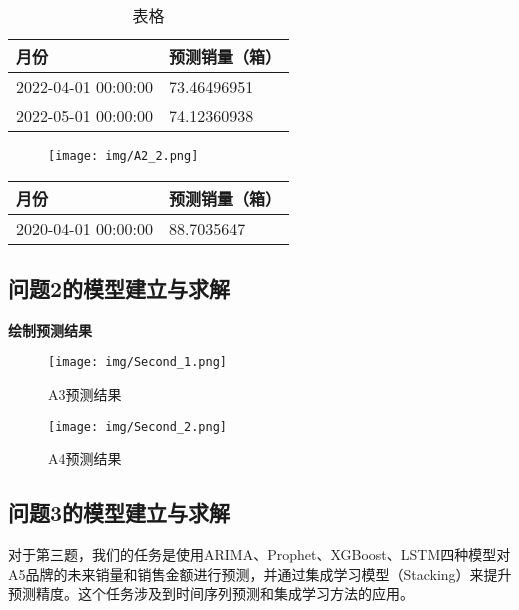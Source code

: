 \documentclass[a4paper]{article}
\begin{document}
	\setlength{\extrarowheight}{4pt}
	\begin{table}[H]

		\centering
	
		\begin{tabularx}{\textwidth}{|X|X|} %
	
		\hline
	
		月份 & 预测销量（箱）\\
	
		\hline
	
		\hline
		2022-04-01 00:00:00	&73.46496951\\
		\hline
		2022-05-01 00:00:00	&74.12360938\\
	
		\hline
	
		\end{tabularx}
	
		\caption{表格}
	
	\end{table}


	\begin{figure}[H]
		\centering
		\texttt{[image: img/A2\_2.png]}
	\end{figure}


	\setlength{\extrarowheight}{4pt}
	\begin{table}[H]
		\centering
		\begin{tabularx}{\textwidth}{|X|X|} %
			\hline
			月份 & 预测销量（箱）\\
			\hline
			2020-04-01 00:00:00	&88.7035647\\
			\hline
		\end{tabularx}
	\end{table}
	\subsection{问题2的模型建立与求解}


	\textbf{绘制预测结果}


	\begin{figure}[H]
		\centering
		\texttt{[image: img/Second\_1.png]}
		\caption{A3预测结果}
	\end{figure}
	\begin{figure}[H]
		\centering
		\texttt{[image: img/Second\_2.png]}
		\caption{A4预测结果}
	\end{figure}

	\subsection{问题3的模型建立与求解}
	对于第三题，我们的任务是使用ARIMA、Prophet、XGBoost、LSTM四种模型对A5品牌的未来销量和销售金额进行预测，并通过集成学习模型（Stacking）来提升预测精度。这个任务涉及到时间序列预测和集成学习方法的应用。
\end{document}
